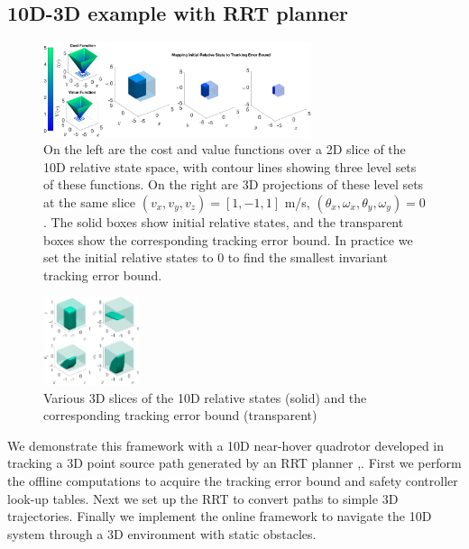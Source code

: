 \subsection{10D-3D example with RRT planner\label{sec:resultsRRT}}


\begin{figure}
	\centering
	\includegraphics[width=0.7\textwidth]{fig/quad10D_example_cost}
	\caption{On the left are the cost and value functions over a 2D slice of the 10D relative state space, with contour lines showing three level sets of these functions. On the right are 3D projections of these level sets at the same slice $(v_{x},v_{y},v_{z})=[1, -1, 1]$ m/s, $(\theta_{x},\omega_{x},\theta_{y},\omega_{y})=0$. The solid boxes show initial relative states, and the transparent boxes show the corresponding tracking error bound. In practice we set the initial relative states to 0 to find the smallest invariant tracking error bound.}
	\label{fig:quad10D_example}
	\end{figure} 
\begin{figure}
	\centering
	\includegraphics[width=0.25\textwidth]{fig/quad10D_slices}
	\caption{Various 3D slices of the 10D relative states (solid) and the corresponding tracking error bound (transparent)}
	\label{fig:quad10D_example_slices}
\end{figure} 
We demonstrate this framework with a 10D near-hover quadrotor developed in \cite{Bouffard12} tracking a 3D point source path generated by an RRT planner \cite{Kuffner2000},\cite{Kavraki1996}. First we perform the offline computations to acquire the tracking error bound and safety controller look-up tables. Next we set up the RRT to convert paths to simple 3D trajectories. Finally we implement the online framework to navigate the 10D system through a 3D environment with static obstacles.

